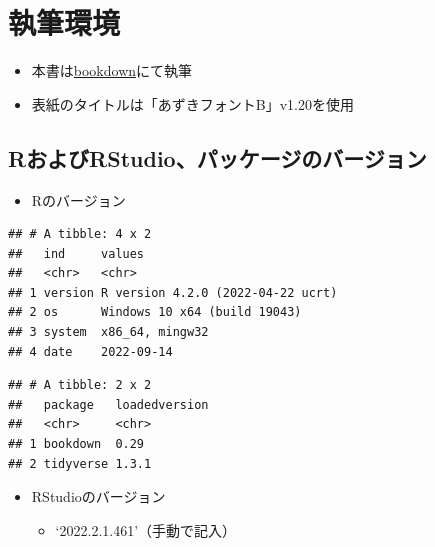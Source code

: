 \documentclass[
  xelatex,ja=standard, b5paper]{bxjsbook}
\providecommand{\tightlist}{%
  \setlength{\itemsep}{0pt}\setlength{\parskip}{0pt}}
\begin{document}
\hypertarget{ux57f7ux7b46ux74b0ux5883}{%
\section*{執筆環境}\label{ux57f7ux7b46ux74b0ux5883}}

\begin{itemize}
\tightlist
\item
  本書は\href{https://bookdown.org/}{bookdown}にて執筆
\item
  表紙のタイトルは「あずきフォントB」v1.20を使用
\end{itemize}

\hypertarget{rux304aux3088ux3073rstudioux30d1ux30c3ux30b1ux30fcux30b8ux306eux30d0ux30fcux30b8ux30e7ux30f3}{%
\subsection*{RおよびRStudio、パッケージのバージョン}\label{rux304aux3088ux3073rstudioux30d1ux30c3ux30b1ux30fcux30b8ux306eux30d0ux30fcux30b8ux30e7ux30f3}}

\begin{itemize}
\tightlist
\item
  Rのバージョン
\end{itemize}

\begin{verbatim}
## # A tibble: 4 x 2
##   ind     values                           
##   <chr>   <chr>                            
## 1 version R version 4.2.0 (2022-04-22 ucrt)
## 2 os      Windows 10 x64 (build 19043)     
## 3 system  x86_64, mingw32                  
## 4 date    2022-09-14
\end{verbatim}

\begin{verbatim}
## # A tibble: 2 x 2
##   package   loadedversion
##   <chr>     <chr>        
## 1 bookdown  0.29         
## 2 tidyverse 1.3.1
\end{verbatim}

\begin{itemize}
\tightlist
\item
  RStudioのバージョン

  \begin{itemize}
  \tightlist
  \item
    `2022.2.1.461'（手動で記入）
  \end{itemize}
\end{itemize}
\end{document}
